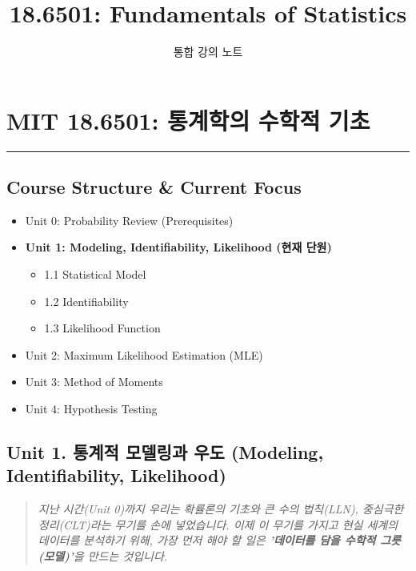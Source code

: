 \documentclass[11pt,a4paper]{book}
\title{\textbf{18.6501: Fundamentals of Statistics}}
\author{통합 강의 노트}
\date{}
\theoremstyle{definition}
\begin{document}
\maketitle
\tableofcontents


\chapter{MIT 18.6501: 통계학의 수학적 기초}
\label{ch:lecture1}


\vspace{1cm}
\hrule
\vspace{1cm}

\section*{Course Structure \& Current Focus}
\begin{itemize}
    \item Unit 0: Probability Review (Prerequisites)
    \item \textbf{\textcolor{mainblue}{Unit 1: Modeling, Identifiability, Likelihood (현재 단원)}}
    \begin{itemize}
        \item 1.1 Statistical Model
        \item 1.2 Identifiability
        \item 1.3 Likelihood Function
    \end{itemize}
    \item Unit 2: Maximum Likelihood Estimation (MLE)
    \item Unit 3: Method of Moments
    \item Unit 4: Hypothesis Testing
\end{itemize}


\section{Unit 1. 통계적 모델링과 우도 (Modeling, Identifiability, Likelihood)}

\begin{quote}
\textit{지난 시간(Unit 0)까지 우리는 확률론의 기초와 큰 수의 법칙(LLN), 중심극한정리(CLT)라는 무기를 손에 넣었습니다. 이제 이 무기를 가지고 현실 세계의 데이터를 분석하기 위해, 가장 먼저 해야 할 일은 \textbf{'데이터를 담을 수학적 그릇(모델)'}을 만드는 것입니다.}
\end{quote}
\end{document}
